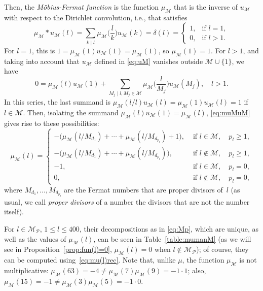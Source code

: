 \documentclass[11pt, a4paper]{article}
\newcommand{\calM}{\mathcal{M}}
\newcommand{\uM}{u_\calM}
\newcommand{\muM}{\mu_\calM}
\newcommand{\Mp}{\calM_{\mathcal{P}}}
\theoremstyle{plain}
\theoremstyle{definition}
\begin{document}
Then, the \textit{M\"obius-Fermat function} is the function $\muM$ that is the inverse of $\uM$
with respect to the Dirichlet convolution, i.e., that satisfies
\begin{equation}
\label{eq:muMuMconv}
  \muM * \uM (l) = \sum_{k \mid l} \muM\Big(\frac{l}{k}\Big)\uM(k) 
  = \delta(l) = 
  \begin{cases}
  1, & \text{if } l=1,\\
  0, & \text{if } l>1.
  \end{cases}
\end{equation}
For $l=1$, this is $1 = \muM(1)\uM(1) = \muM(1)$, so $\muM(1)=1$. 
For $l>1$, and taking into account that $\uM$ defined in \eqref{eq:uM} vanishes outside $\calM \cup \{1\}$, we have
\begin{equation}
\label{eq:muMuM}
  0 = \muM(l)\uM(1) + \sum_{M_j \mid l, M_j \in \calM} \muM\Big(\frac{l}{M_j}\Big)\uM(M_j),
  \quad l > 1.
\end{equation}
In this series, the last summand is $\muM({l}/{l})\uM(l) = \muM(1)\uM(l) = 1$ if $l \in \calM$. 
Then, isolating the summand $\muM(l)\uM(1) = \muM(l)$, \eqref{eq:muMuM} gives rise to these possibilities:
\begin{equation}
\label{eq:mu(l)rec}
\muM(l) = 
  \begin{cases}
    -\big( \muM({l}/{M_{d_1}}) + \cdots + \muM({l}/{M_{d_{p_l}}}) + 1 \big),
    & \text{ if } l\in \calM, \quad p_{l} \geq 1, \\ 
    -\big( \muM({l}/{M_{d_1}}) + \cdots + \muM({l}/{M_{d_{p_l}}}) ),
    & \text{ if } l\notin \calM, \quad p_{l} \geq 1, \\
    -1,
    & \text{ if } l\in \calM, \quad p_{l} = 0, \\ 
    0,
    & \text{ if } l\notin \calM, \quad p_{l} = 0,
  \end{cases}
\end{equation}
where $M_{d_1},\dots, M_{d_{p_l}}$ are the Fermat numbers that are proper divisors of~$l$
(as usual, we call \textit{proper divisors} of a number the divisors that are not the number itself).

For $l \in \Mp$, $1 \le l \le 400$, their decompositions as in \eqref{eq:Mp},
which are unique, 
as well as the values of $\muM(l)$, 
can be seen in Table~\ref{table:mumanM}
(as we will see in Proposition~\ref{prop:fun(l)=0}, $\muM(l) = 0$ when $l \notin \Mp$);
of course, they can be computed using~\eqref{eq:mu(l)rec}.
Note that, unlike $\mu$, the function $\muM$ is not multiplicative: 
$\muM(63) = -4 \ne \muM(7) \muM(9) = -1\cdot 1$;
also, $\muM(15) = -1 \ne \muM(3) \muM(5) = -1\cdot0$.
\end{document}
